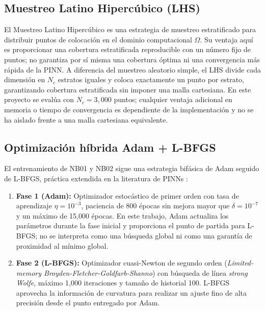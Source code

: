 \subsection{Muestreo Latino Hipercúbico (LHS)}

El Muestreo Latino Hipercúbico \parencite{mckay1979lhs} es una estrategia de
muestreo estratificado para distribuir puntos de colocación en el dominio
computacional $\Omega$. Su ventaja aquí es proporcionar una cobertura
estratificada reproducible con un número fijo de puntos; no garantiza por sí
misma una cobertura óptima ni una convergencia más rápida de la PINN.
A diferencia del muestreo aleatorio simple, el LHS divide cada dimensión en
$N_c$ estratos iguales y coloca exactamente un punto por estrato, garantizando
cobertura estratificada sin imponer una malla cartesiana. En este proyecto se
evalúa con $N_c=3{,}000$ puntos; cualquier ventaja adicional en memoria o tiempo
de convergencia es dependiente de la implementación y no se ha aislado frente a
una malla cartesiana equivalente.

\subsection{Optimización híbrida Adam + L-BFGS}

El entrenamiento de NB01 y NB02 sigue una estrategia bifásica de Adam seguido de L-BFGS,
práctica extendida en la literatura de PINNs \parencite{cuomo2022scientific}:

\begin{enumerate}
    \item \textbf{Fase 1 (Adam):} Optimizador estocástico de primer orden
    \parencite{kingma2015adam} con tasa de aprendizaje $\eta = 10^{-3}$,
    paciencia de 800 épocas sin mejora mayor que $\delta = 10^{-7}$ y un
    máximo de 15{,}000 épocas. En este trabajo, Adam actualiza los parámetros
    durante la fase inicial y proporciona el punto de partida para L-BFGS; no
    se interpreta como una búsqueda global ni como una garantía de proximidad al
    mínimo global.

    \item \textbf{Fase 2 (L-BFGS):} Optimizador cuasi-Newton de segundo orden
    (\textit{Limited-memory Broyden-Fletcher-Goldfarb-Shanno})
    \parencite{nocedal2006numerical} con búsqueda de línea \textit{strong Wolfe},
    máximo 1{,}000 iteraciones y tamaño de historial 100. L-BFGS aprovecha la
    información de curvatura para realizar un ajuste fino de alta precisión
    desde el punto entregado por Adam.
\end{enumerate}

